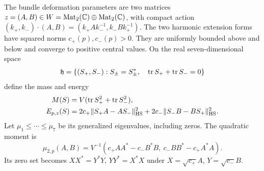 The bundle deformation parameters are two matrices
$z=(A,B)\in W=\operatorname{Mat}_2(\mathbb C)\oplus\operatorname{Mat}_2(\mathbb C)$,
with compact action
$(k_+,k_-)\cdot(A,B)=(k_+Ak_-^{-1},k_-Bk_+^{-1})$.
The two harmonic extension forms have squared norms
$c_+(p),c_-(p)>0$. They are uniformly bounded above
and below and converge to positive central values.
On the real seven-dimensional space
\[
 \mathfrak h=\{(S_+,S_-):S_\pm=S_\pm^*,\quad\operatorname{tr} S_++\operatorname{tr} S_-=0\}
\]
define the mass and energy
\begin{equation}\label{eq:intro-finite-pair}
 \begin{split}
 M(S)&=V(\operatorname{tr} S_+^2+\operatorname{tr} S_-^2),\\
 E_{p,z}(S)&=2c_+\|S_+A-AS_-\|_{\rm HS}^2
                  +2c_-\|S_-B-BS_+\|_{\rm HS}^2.
 \end{split}
\end{equation}
Let $\mu_1\le\cdots\le\mu_7$ be its generalized
eigenvalues, including zeros. The quadratic moment is
\[
 \mu_{2,p}(A,B)=V^{-1}
       (c_+AA^*-c_-B^*B,\ c_-BB^*-c_+A^*A).
\]
Its zero set becomes $XX^*=Y^*Y$, $YY^*=X^*X$
under $X=\sqrt{c_+}A$, $Y=\sqrt{c_-}B$.

